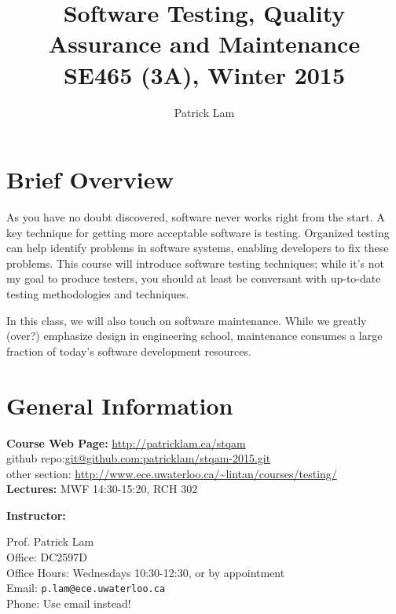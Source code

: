 \documentclass{article}
\begin{document}
\title{Software Testing, Quality Assurance and Maintenance\\SE465 (3A), Winter 2015}
\author{Patrick Lam}
\renewcommand{\today}{}
\maketitle
\vspace*{-2em}

\section*{Brief Overview}
As you have no doubt discovered, software never works right from the
start. A key technique for getting more acceptable software is
testing. Organized testing can help identify problems in software
systems, enabling developers to fix these problems.  This course will
introduce software testing techniques; while it's not my goal
to produce testers, you should at least be conversant
with up-to-date testing methodologies and techniques.

In this class, we will also touch on software maintenance. While we
greatly (over?) emphasize design in engineering school, maintenance
consumes a large fraction of today's software development resources.

\section*{General Information}

\noindent
\begin{tabbing}
  {\bf Course Web Page:} \= \url{http://patricklam.ca/stqam}\\
  github repo:\= \url{git@github.com:patricklam/stqam-2015.git}\\
  other section: \> \url{http://www.ece.uwaterloo.ca/~lintan/courses/testing/} \\
  {\bf Lectures:} \> MWF 14:30-15:20, RCH 302
\end{tabbing}

\noindent
{\bf Instructor:} \\

\noindent
\hspace*{2em} \begin{minipage}{.6\textwidth}
Prof. Patrick Lam\\
Office: DC2597D\\
Office Hours: Wednesdays 10:30-12:30, or by appointment\\
Email: {\tt p.lam@ece.uwaterloo.ca}\\
Phone: Use email instead!

\end{minipage} \\[1em]
\end{document}
